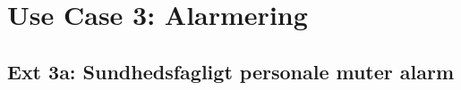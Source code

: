 \section{Use Case 3: Alarmering}

\subsection{Ext 3a: Sundhedsfagligt personale muter alarm}

\clearpage